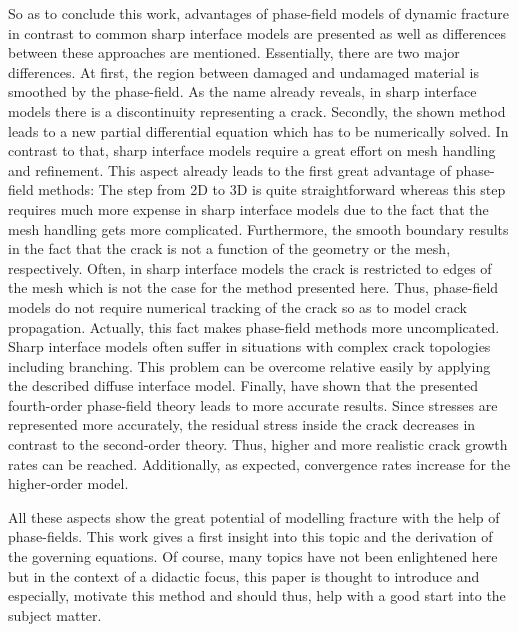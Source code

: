 So as to conclude this work, advantages of phase-field models of dynamic fracture in contrast to common sharp interface models are presented as well as differences between these approaches are mentioned. Essentially, there are two major differences. At first, the region between damaged and undamaged material is smoothed by the phase-field. As the name already reveals, in sharp interface models there is a discontinuity representing a crack. Secondly, the shown method leads to a new partial differential equation which has to be numerically solved. In contrast to that, sharp interface models require a great effort on mesh handling and refinement. This aspect already leads to the first great advantage of phase-field methods: The step from 2D to 3D is quite straightforward whereas this step requires much more expense in sharp interface models due to the fact that the mesh handling gets more complicated. Furthermore, the smooth boundary results in the fact that the crack is not a function of the geometry or the mesh, respectively. Often, in sharp interface models the crack is restricted to edges of the mesh which is not the case for the method presented here. Thus, phase-field models do not require numerical tracking of the crack so as to model crack propagation. Actually, this fact makes phase-field methods more uncomplicated. Sharp interface models often suffer in situations with complex crack topologies including branching. This problem can be overcome relative easily by applying the described diffuse interface model. Finally, \citet{02_PF_HO_brittle} have shown that the presented fourth-order phase-field theory leads to more accurate results. Since stresses are represented more accurately, the residual stress inside the crack decreases in contrast to the second-order theory. Thus, higher and more realistic crack growth rates can be reached. Additionally, as expected, convergence rates increase for the higher-order model.

All these aspects show the great potential of modelling fracture with the help of phase-fields. This work gives a first insight into this topic and the derivation of the governing equations. Of course, many topics have not been enlightened here but in the context of a didactic focus, this paper is thought to introduce and especially, motivate this method and should thus, help with a good start into the subject matter.

